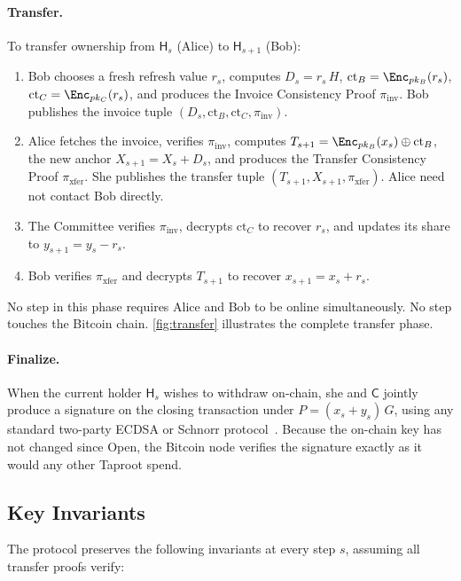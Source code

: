 \paragraph{Transfer.} To transfer ownership from $\mathsf{H}_s$ (Alice) to $\mathsf{H}_{s+1}$ (Bob):
\begin{enumerate}
  \item Bob chooses a fresh refresh value $r_s$, computes $D_s = r_s\,H$, $\mathrm{ct}_B = \Enc_{pk_B}(r_s)$, $\mathrm{ct}_C = \Enc_{pk_C}(r_s)$, and produces the Invoice Consistency Proof $\pi_{\mathrm{inv}}$. Bob publishes the invoice tuple $(D_s, \mathrm{ct}_B, \mathrm{ct}_C, \pi_{\mathrm{inv}})$.
  \item Alice fetches the invoice, verifies $\pi_{\mathrm{inv}}$, computes $T_{s+1} = \Enc_{pk_B}(x_s) \oplus \mathrm{ct}_B$, the new anchor $X_{s+1} = X_s + D_s$, and produces the Transfer Consistency Proof $\pi_{\mathrm{xfer}}$. She publishes the transfer tuple $(T_{s+1}, X_{s+1}, \pi_{\mathrm{xfer}})$. Alice need not contact Bob directly.
  \item The Committee verifies $\pi_{\mathrm{inv}}$, decrypts $\mathrm{ct}_C$ to recover $r_s$, and updates its share to $y_{s+1} = y_s - r_s$.
  \item Bob verifies $\pi_{\mathrm{xfer}}$ and decrypts $T_{s+1}$ to recover $x_{s+1} = x_s + r_s$.
\end{enumerate}
No step in this phase requires Alice and Bob to be online simultaneously. No step touches the Bitcoin chain. \autoref{fig:transfer} illustrates the complete transfer phase.



\paragraph{Finalize.} When the current holder $\mathsf{H}_s$ wishes to withdraw on-chain, she and $\mathsf{C}$ jointly produce a signature on the closing transaction under $P = (x_s + y_s)\,G$, using any standard two-party ECDSA or Schnorr protocol~\cite{lindell2017fast, komlo2021frost}. Because the on-chain key has not changed since Open, the Bitcoin node verifies the signature exactly as it would any other Taproot spend.

\subsection{Key Invariants}\label{sec:invariants}

The \thunderbolt protocol preserves the following invariants at every step $s$, assuming all transfer proofs verify:

